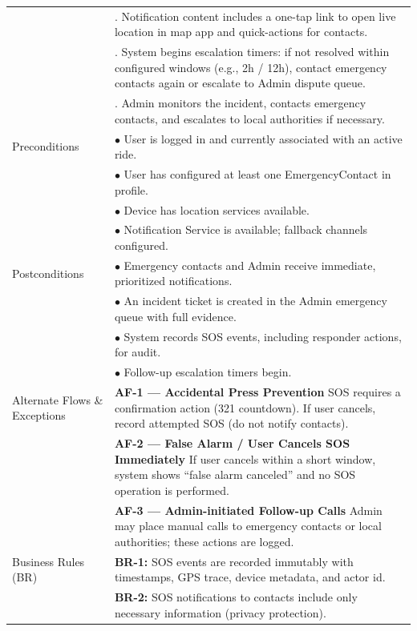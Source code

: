 \begin{longtable}{|>{\raggedright\arraybackslash}p{4cm}|>{\raggedright\arraybackslash}p{11cm}|}
& 7. Notification content includes a one-tap link to open live location in map app and quick-actions for contacts. \\
& 8. System begins escalation timers: if not resolved within configured windows (e.g., 2h / 12h), contact emergency contacts again or escalate to Admin dispute queue. \\
& 9. Admin monitors the incident, contacts emergency contacts, and escalates to local authorities if necessary. \\
\hline
Preconditions & $\bullet$ User is logged in and currently associated with an active ride. \\
& $\bullet$ User has configured at least one EmergencyContact in profile. \\
& $\bullet$ Device has location services available. \\
& $\bullet$ Notification Service is available; fallback channels configured. \\
\hline
Postconditions & $\bullet$ Emergency contacts and Admin receive immediate, prioritized notifications. \\
& $\bullet$ An incident ticket is created in the Admin emergency queue with full evidence. \\
& $\bullet$ System records SOS events, including responder actions, for audit. \\
& $\bullet$ Follow-up escalation timers begin. \\
\hline
Alternate Flows \& Exceptions & \textbf{AF-1 — Accidental Press Prevention} \newline SOS requires a confirmation action (321 countdown). If user cancels, record attempted SOS (do not notify contacts). \\
& \textbf{AF-2 — False Alarm / User Cancels SOS Immediately} \newline If user cancels within a short window, system shows ``false alarm canceled'' and no SOS operation is performed. \\
& \textbf{AF-3 — Admin-initiated Follow-up Calls} \newline Admin may place manual calls to emergency contacts or local authorities; these actions are logged. \\
\hline
Business Rules (BR) & \textbf{BR-1:} SOS events are recorded immutably with timestamps, GPS trace, device metadata, and actor id. \\
& \textbf{BR-2:} SOS notifications to contacts include only necessary information (privacy protection). \\

\end{longtable}
